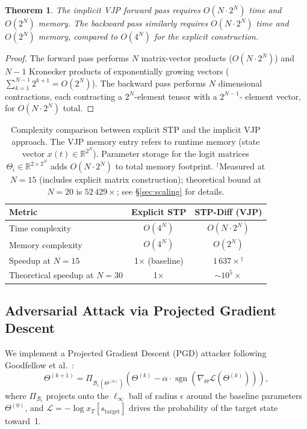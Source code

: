 \documentclass[11pt,a4paper]{article}
\newtheorem{theorem}{Theorem}[section]
\begin{document}
\begin{theorem}
\label{thm:complexity}
The implicit VJP forward pass requires $O(N \cdot 2^N)$ time and $O(2^N)$ memory. The backward pass similarly requires $O(N \cdot 2^N)$ time and $O(2^N)$ memory, compared to $O(4^N)$ for the explicit construction.
\end{theorem}

\begin{proof}
\renewcommand{\qedsymbol}{}
The forward pass performs $N$ matrix-vector products ($O(N \cdot 2^N)$) and $N-1$ Kronecker products of exponentially growing vectors ($\sum_{k=1}^{N-1} 2^{k+1} = O(2^N)$). The backward pass performs $N$ dimensional contractions, each contracting a $2^N$-element tensor with a $2^{N-1}$- element vector, for $O(N \cdot 2^N)$ total.
\end{proof}

\begin{table}[ht]
\centering
\caption{Complexity comparison between explicit STP and the implicit VJP approach. The VJP memory entry refers to runtime memory (state vector $x(t) \in \mathbb{R}^{2^N}$). Parameter storage for the logit matrices $\Theta_i \in \mathbb{R}^{2 \times 2^N}$ adds $O(N \cdot 2^N)$ to total memory footprint. $^\dagger$Measured at $N=15$ (includes explicit matrix construction); theoretical bound at $N=20$ is $52\,429\times$; see \S\ref{sec:scaling} for details.}

\label{tab:complexity}

\begin{tabular}{lcc}
\toprule
\textbf{Metric} & \textbf{Explicit STP} & \textbf{STP-Diff (VJP)} \\
\midrule
Time complexity  & $O(4^N)$          & $O(N \cdot 2^N)$ \\
Memory complexity & $O(4^N)$         & $O(2^N)$ \\
Speedup at $N=15$ & 1$\times$ (baseline) & \textbf{$1\,637\times$}$^\dagger$ \\
Theoretical speedup at $N=30$ & 1$\times$ & $\sim 10^5\times$ \\
\bottomrule
\end{tabular}
\end{table}

\subsection{Adversarial Attack via Projected Gradient Descent}
\label{sec:pgd}

We implement a Projected Gradient Descent (PGD) attacker following Goodfellow et al.~\cite{goodfellow2015explaining}:
\begin{equation}\label{eq:pgd}
\Theta^{(k+1)} = \Pi_{\mathcal{B}_\epsilon(\Theta^{(0)})}\left( \Theta^{(k)} - \alpha \cdot \operatorname{sgn}\left( \nabla_\Theta \mathcal{L}(\Theta^{(k)}) \right) \right),
\end{equation}
where $\Pi_{\mathcal{B}_\epsilon}$ projects onto the $\ell_\infty$ ball of radius $\epsilon$ around the baseline parameters $\Theta^{(0)}$, and $\mathcal{L} = -\log x_T[s_{\text{target}}]$ drives the probability of the target state toward~1.
\end{document}

